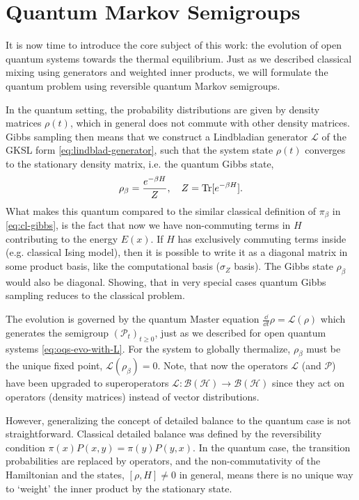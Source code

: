 \section{Quantum Markov Semigroups}

It is now time to introduce the core subject of this work: the evolution of open quantum systems towards the thermal equilibrium. Just as we described classical mixing using generators and weighted inner products, we will formulate the quantum problem using reversible quantum Markov semigroups.

In the quantum setting, the probability distributions are given by density matrices $\rho(t)$, which in general does not commute with other density matrices. Gibbs sampling then means that we
construct a Lindbladian generator $\mathcal{L}$ of the GKSL form \eqref{eq:lindblad-generator}, such that the system state $\rho(t)$ converges to the stationary density matrix, i.e. the quantum Gibbs state,
\begin{equation}
    \rho_\beta = \frac{e^{-\beta H}}{Z}, \quad Z = \operatorname{Tr}[e^{-\beta H}].
\end{equation}
What makes this quantum compared to the similar classical definition of  $\pi_\beta$ in \eqref{eq:cl-gibbs}, is the fact that now we have non-commuting terms in $H$ contributing to the energy $E(x)$. If $H$ has exclusively commuting terms inside (e.g. classical Ising model), then it is possible to write it as a diagonal matrix in some product basis, like the computational basis ($\sigma_Z$ basis). The Gibbs state $\rho_\beta$ would also be diagonal. Showing, that in very special cases quantum Gibbs sampling reduces to the classical problem.

The evolution is governed by the quantum Master equation $\frac{\dd}{\dd t} \rho = \mathcal{L}(\rho)$ which generates the semigroup $(\mathcal{P}_t)_{t\geq 0}$, just as we described for open quantum systems \eqref{eq:oqs-evo-with-L}. For the system to globally thermalize, $\rho_\beta$ must be the unique fixed point, $\mathcal{L}(\rho_\beta) = 0$. Note, that now the operators $\mathcal{L}$ (and $\mathcal{P}$) have been upgraded to superoperators $\mathcal{L}: \mathcal{B}(\mathcal{H})\rightarrow \mathcal{B}(\mathcal{H})$ since they act on operators (density matrices) instead of vector distributions.

However, generalizing the concept of detailed balance to the quantum case is not straightforward. Classical detailed balance was defined by the reversibility condition $\pi(x) P(x, y) = \pi(y) P(y, x)$. In the quantum case, the transition probabilities are replaced by operators, and the non-commutativity of the Hamiltonian and the states, $[\rho, H] \neq 0$ in general, means there is no unique way to `weight' the inner product by the stationary state.


